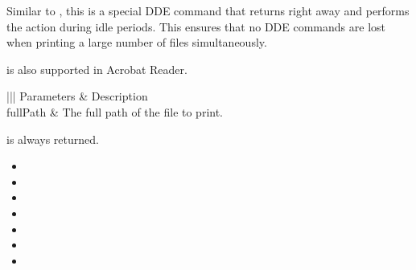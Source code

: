 \documentclass[letterpaper,12pt,english,openany,oneside]{sphinxmanual}
\begin{document}
Similar to , this is a special DDE command that returns  right away and performs the action during idle periods. This ensures that no DDE commands are lost when printing a large number of files simultaneously.

 is also supported in Acrobat Reader.


\begin{sphinxVerbatim}[commandchars=\\\{\}]
\PYG{p}{[} \PYG{p}{]}
\end{sphinxVerbatim}
\label{\detokenize{IAC_API_DDE_Messages:parameters-21}}


\begin{savenotes}\sphinxattablestart
\centering
{}\label{\detokenize{IAC_API_DDE_Messages:section-21}}\nobreak
\begin{tabular}[t]{|||}
\hline
\sphinxstyletheadfamily 
Parameters
&\sphinxstyletheadfamily 
Description
\\
\hline
fullPath
&
The full path of the file to print.
\\
\hline
\end{tabular}
\par
\sphinxattableend\end{savenotes}


 is always returned.

\label{\detokenize{IAC_API_DDE_Messages:related-methods-21}}
\begin{itemize}
\item {} 

\item {} 

\item {} 

\item {} 

\item {} 

\item {} 

\item {} 

\end{itemize}
\end{document}
